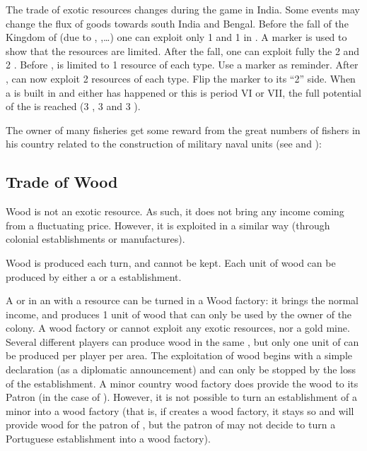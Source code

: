 \label{chIncomes:TradeIndia}
The trade of exotic resources changes during the game in India. Some events
may change the flux of goods towards south India and Bengal.
\bparag Before the fall of the Kingdom of  (due to
, ,\ldots) one
can exploit only 1  and 1  in
. A marker is used to show that the resources are
limited.
\bparag After the fall, one can exploit fully the 2 
and 2 .
\bparag Before ,  is limited
to 1 resource of each type. Use a marker as reminder.
\bparag After ,  can now
exploit 2 resources of each type. Flip the marker to its ``2'' side.
\bparag When a \COL is built in  and either
 has happened or this is period VI or VII, the
full potential of the \Area is reached (3 , 3
 and 3 ).

 The owner of many fisheries get some
reward from the great numbers of fishers in his country related to the
construction of military naval units (see  and ):



\subsection{Trade of Wood}\label{chIncomes:Wood}

\aparag Wood is not an exotic resource. As such, it does not bring any income
coming from a fluctuating price. However, it is exploited in a similar way
(through colonial establishments or manufactures).

 Wood is produced each turn, and cannot be kept. Each
unit of wood can be produced by either a \MNU or a \ROTW establishment.

 A \COL\faceplus or \TP\faceplus in an \Area with a
 resource can be turned in a Wood factory: it brings the normal
income, and produces 1 unit of wood that can only be used by the owner of the
colony.
\bparag A wood factory \TP or \COL cannot exploit any exotic resources, nor a
gold mine. Several different players can produce wood in the same \Area, but
only one unit of  can be produced per player per area.
\bparag The exploitation of wood begins with a simple declaration (as a
diplomatic announcement) and can only be stopped by the loss of the
establishment.
\bparag A minor country wood factory does provide the wood to its Patron (in
the case of ). However, it is not possible to turn an
establishment of a minor into a wood factory (that is, if \POR creates a wood
factory, it stays so and will provide wood for the patron of \paysPortugal,
but the patron of \paysPortugal may not decide to turn a Portuguese
establishment into a wood factory).

